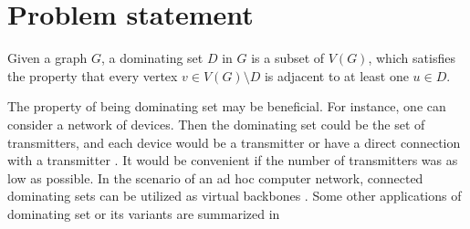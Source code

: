 \section{Problem statement}
\begin{definition}
Given a graph $G$, a dominating set $D$ in $G$ is a subset of $V(G)$, which satisfies the property that every vertex $v \in V(G)\setminus D$ is adjacent to at least one $u \in D$.
\end{definition}
The property of being dominating set may be beneficial. For instance, one can consider a network of devices. Then the dominating set could be the set of transmitters, and each device would be a transmitter or have a direct connection with a transmitter \cite{dijkstra2022weighted}. It would be convenient if the number of transmitters was as low as possible. In the scenario of an ad hoc computer network, connected dominating sets can be utilized as virtual backbones \cite{BAI2020102023}. Some other applications of dominating set or its variants are summarized in \cite{levin2020combinatorial}

